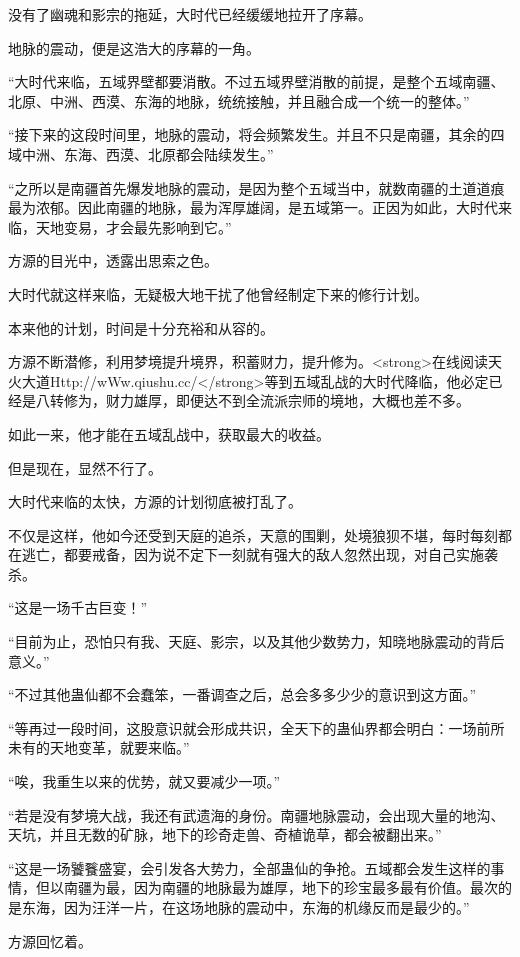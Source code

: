 \begin{this_body}
没有了幽魂和影宗的拖延，大时代已经缓缓地拉开了序幕。

地脉的震动，便是这浩大的序幕的一角。

“大时代来临，五域界壁都要消散。不过五域界壁消散的前提，是整个五域南疆、北原、中洲、西漠、东海的地脉，统统接触，并且融合成一个统一的整体。”

“接下来的这段时间里，地脉的震动，将会频繁发生。并且不只是南疆，其余的四域中洲、东海、西漠、北原都会陆续发生。”

“之所以是南疆首先爆发地脉的震动，是因为整个五域当中，就数南疆的土道道痕最为浓郁。因此南疆的地脉，最为浑厚雄阔，是五域第一。正因为如此，大时代来临，天地变易，才会最先影响到它。”

方源的目光中，透露出思索之色。

大时代就这样来临，无疑极大地干扰了他曾经制定下来的修行计划。

本来他的计划，时间是十分充裕和从容的。

方源不断潜修，利用梦境提升境界，积蓄财力，提升修为。<strong>在线阅读天火大道Http://wWw.qiushu.cc/</strong>等到五域乱战的大时代降临，他必定已经是八转修为，财力雄厚，即便达不到全流派宗师的境地，大概也差不多。

如此一来，他才能在五域乱战中，获取最大的收益。

但是现在，显然不行了。

大时代来临的太快，方源的计划彻底被打乱了。

不仅是这样，他如今还受到天庭的追杀，天意的围剿，处境狼狈不堪，每时每刻都在逃亡，都要戒备，因为说不定下一刻就有强大的敌人忽然出现，对自己实施袭杀。

“这是一场千古巨变！”

“目前为止，恐怕只有我、天庭、影宗，以及其他少数势力，知晓地脉震动的背后意义。”

“不过其他蛊仙都不会蠢笨，一番调查之后，总会多多少少的意识到这方面。”

“等再过一段时间，这股意识就会形成共识，全天下的蛊仙界都会明白：一场前所未有的天地变革，就要来临。”

“唉，我重生以来的优势，就又要减少一项。”

“若是没有梦境大战，我还有武遗海的身份。南疆地脉震动，会出现大量的地沟、天坑，并且无数的矿脉，地下的珍奇走兽、奇植诡草，都会被翻出来。”

“这是一场饕餮盛宴，会引发各大势力，全部蛊仙的争抢。五域都会发生这样的事情，但以南疆为最，因为南疆的地脉最为雄厚，地下的珍宝最多最有价值。最次的是东海，因为汪洋一片，在这场地脉的震动中，东海的机缘反而是最少的。”

方源回忆着。


\end{this_body}
